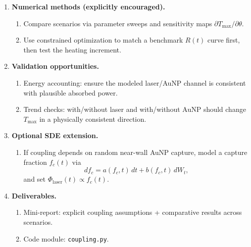 \documentclass[11pt]{article}
\begin{document}
\begin{enumerate}
		\item \textbf{Numerical methods (explicitly encouraged).}
		\begin{enumerate}
			\item Compare scenarios via parameter sweeps and sensitivity maps $\partial T_{\max}/\partial\theta$.
			\item Use constrained optimization to match a benchmark $R(t)$ curve first, then test the heating increment.
		\end{enumerate}
		
		\item \textbf{Validation opportunities.}
		\begin{enumerate}
			\item Energy accounting: ensure the modeled laser/AuNP channel is consistent with plausible absorbed power.
			\item Trend checks: with/without laser and with/without AuNP should change $T_{\max}$ in a physically consistent direction.
		\end{enumerate}
		
		\item \textbf{Optional SDE extension.}
		\begin{enumerate}
			\item If coupling depends on random near-wall AuNP capture, model a capture fraction $f_c(t)$ via
			\[
			df_c=a(f_c,t)\,dt+b(f_c,t)\,dW_t,
			\]
			and set $\Phi_{\mathrm{laser}}(t)\propto f_c(t)$.
		\end{enumerate}
		
		\item \textbf{Deliverables.}
		\begin{enumerate}
			\item Mini-report: explicit coupling assumptions + comparative results across scenarios.
			\item Code module: \texttt{coupling.py}.
		\end{enumerate}
	\end{enumerate}
	
	\newpage
	
\end{document}
